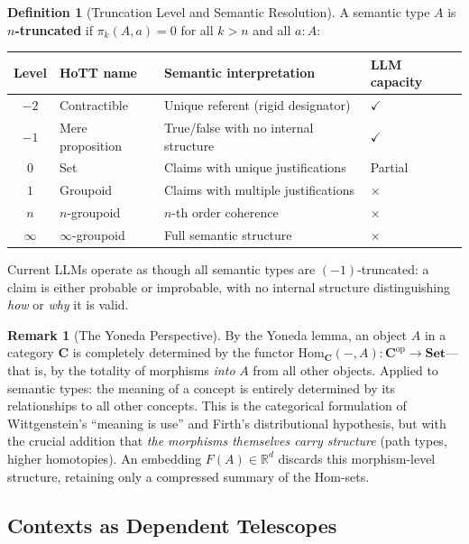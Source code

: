 \documentclass[11pt,a4paper]{article}
\theoremstyle{plain}
\theoremstyle{definition}
\newtheorem{definition}[theorem]{Definition}
\newtheorem{remark}[theorem]{Remark}
\newcommand{\CC}{\mathbf{C}}
\newcommand{\Set}{\mathbf{Set}}
\newcommand{\Hom}{\mathrm{Hom}}
\newcommand{\op}{\mathrm{op}}
\begin{document}
\begin{definition}[Truncation Level and Semantic Resolution]\label{def:truncation}
A semantic type $A$ is \textbf{$n$-truncated} if $\pi_k(A, a) = 0$ for all $k > n$ and all $a : A$:
\begin{center}
\begin{tabular}{@{}clll@{}}
\toprule
\textbf{Level} & \textbf{HoTT name} & \textbf{Semantic interpretation} & \textbf{LLM capacity} \\
\midrule
$-2$ & Contractible & Unique referent (rigid designator) & $\checkmark$ \\
$-1$ & Mere proposition & True/false with no internal structure & $\checkmark$ \\
$0$ & Set & Claims with unique justifications & Partial \\
$1$ & Groupoid & Claims with multiple justifications & $\times$ \\
$n$ & $n$-groupoid & $n$-th order coherence & $\times$ \\
$\infty$ & $\infty$-groupoid & Full semantic structure & $\times$ \\
\bottomrule
\end{tabular}
\end{center}
Current LLMs operate as though all semantic types are $(-1)$-truncated: a claim is either probable or improbable, with no internal structure distinguishing \emph{how} or \emph{why} it is valid.
\end{definition}

\begin{remark}[The Yoneda Perspective]\label{rem:yoneda}
By the Yoneda lemma, an object $A$ in a category $\CC$ is completely determined by the functor $\Hom_\CC(-, A)\colon \CC^{\op} \to \Set$---that is, by the totality of morphisms \emph{into} $A$ from all other objects. Applied to semantic types: the meaning of a concept is entirely determined by its relationships to all other concepts. This is the categorical formulation of Wittgenstein's ``meaning is use'' and Firth's distributional hypothesis, but with the crucial addition that \emph{the morphisms themselves carry structure} (path types, higher homotopies). An embedding $F(A) \in \mathbb{R}^d$ discards this morphism-level structure, retaining only a compressed summary of the Hom-sets.
\end{remark}

\subsection{Contexts as Dependent Telescopes}
\end{document}
